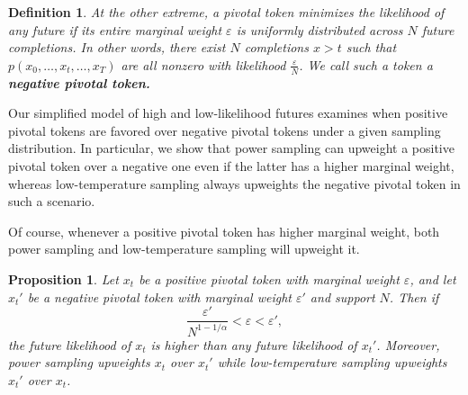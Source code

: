 \documentclass{article}
\newtheorem{proposition}{Proposition}
\newtheorem{definition}{Definition}
\begin{document}
\begin{definition}
\rm
    At the other extreme, a pivotal token minimizes the likelihood of any future if its entire marginal weight $\varepsilon$ is uniformly distributed across $N$ future completions. In other words, there exist $N$ completions $x>t$ such that $p(x_0, \dots, x_t, \dots, x_T)$ are all nonzero with likelihood $\frac{\varepsilon}{N}$. We call such a token a \textbf{negative pivotal token.}
\end{definition}


Our simplified model of high and low-likelihood futures examines when positive pivotal tokens are favored over negative pivotal tokens under a given sampling distribution. In particular, we show that power sampling can upweight a positive pivotal token over a negative one even if the latter has a higher marginal weight, whereas low-temperature sampling always upweights the negative pivotal token in such a scenario. 

Of course, whenever a positive pivotal token has higher marginal weight, both power sampling and low-temperature sampling will upweight it.

\begin{proposition}
    Let $x_t$ be a positive pivotal token with marginal weight $\varepsilon$, and let $x_t'$ be a negative pivotal token with marginal weight $\varepsilon'$ and support $N$. Then if 
    \begin{equation}
        \frac{\varepsilon'}{N^{1 - 1/\alpha}} < \varepsilon < \varepsilon',
    \end{equation}
    the future likelihood of $x_t$ is higher than any future likelihood of $x_t'$. Moreover, power sampling upweights $x_t$ over $x_t'$ while low-temperature sampling upweights $x_t'$ over $x_t$.
\end{proposition}
\end{document}
